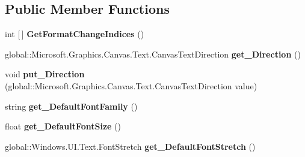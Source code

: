 \subsection*{Public Member Functions}
\begin{DoxyCompactItemize}
\item 
\mbox{\label{interface_microsoft_1_1_graphics_1_1_canvas_1_1_text_1_1_i_canvas_text_layout_a73f2d2dac663dc66cf5846e351b3ecb5}} 
int \mbox{[}$\,$\mbox{]} {\bfseries Get\+Format\+Change\+Indices} ()
\item 
\mbox{\label{interface_microsoft_1_1_graphics_1_1_canvas_1_1_text_1_1_i_canvas_text_layout_adcf04927cfc8f87ca62aed637107ecc8}} 
global\+::\+Microsoft.\+Graphics.\+Canvas.\+Text.\+Canvas\+Text\+Direction {\bfseries get\+\_\+\+Direction} ()
\item 
\mbox{\label{interface_microsoft_1_1_graphics_1_1_canvas_1_1_text_1_1_i_canvas_text_layout_a7e880bd0b063a9b01869580d1fa1dc3a}} 
void {\bfseries put\+\_\+\+Direction} (global\+::\+Microsoft.\+Graphics.\+Canvas.\+Text.\+Canvas\+Text\+Direction value)
\item 
\mbox{\label{interface_microsoft_1_1_graphics_1_1_canvas_1_1_text_1_1_i_canvas_text_layout_ae9a3d34571d57d80cd0bf928ae229311}} 
string {\bfseries get\+\_\+\+Default\+Font\+Family} ()
\item 
\mbox{\label{interface_microsoft_1_1_graphics_1_1_canvas_1_1_text_1_1_i_canvas_text_layout_a100786b18511c24b2f14c20333076955}} 
float {\bfseries get\+\_\+\+Default\+Font\+Size} ()
\item 
\mbox{\label{interface_microsoft_1_1_graphics_1_1_canvas_1_1_text_1_1_i_canvas_text_layout_ac1457e535065d68c28f8fd91ef9aa307}} 
global\+::\+Windows.\+U\+I.\+Text.\+Font\+Stretch {\bfseries get\+\_\+\+Default\+Font\+Stretch} ()
\item 

\end{DoxyCompactItemize}
